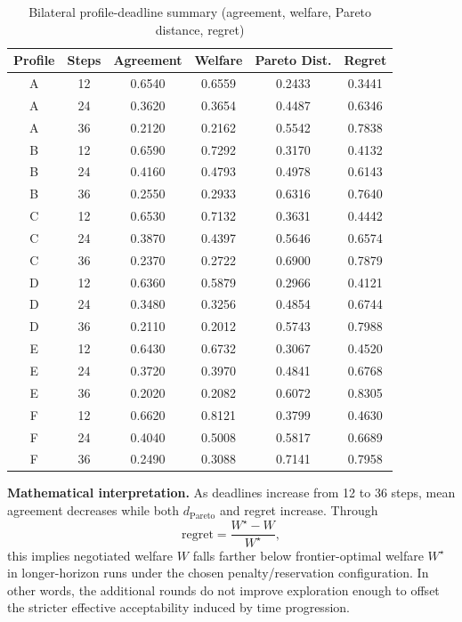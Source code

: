 \documentclass[11pt]{article}
\begin{document}
\begin{table}[H]
\centering
\caption{Bilateral profile-deadline summary (agreement, welfare, Pareto distance, regret)}
\small
\begin{tabular}{cccccc}
\toprule
Profile & Steps & Agreement & Welfare & Pareto Dist. & Regret \\
\midrule
A & 12 & 0.6540 & 0.6559 & 0.2433 & 0.3441 \\
A & 24 & 0.3620 & 0.3654 & 0.4487 & 0.6346 \\
A & 36 & 0.2120 & 0.2162 & 0.5542 & 0.7838 \\
B & 12 & 0.6590 & 0.7292 & 0.3170 & 0.4132 \\
B & 24 & 0.4160 & 0.4793 & 0.4978 & 0.6143 \\
B & 36 & 0.2550 & 0.2933 & 0.6316 & 0.7640 \\
C & 12 & 0.6530 & 0.7132 & 0.3631 & 0.4442 \\
C & 24 & 0.3870 & 0.4397 & 0.5646 & 0.6574 \\
C & 36 & 0.2370 & 0.2722 & 0.6900 & 0.7879 \\
D & 12 & 0.6360 & 0.5879 & 0.2966 & 0.4121 \\
D & 24 & 0.3480 & 0.3256 & 0.4854 & 0.6744 \\
D & 36 & 0.2110 & 0.2012 & 0.5743 & 0.7988 \\
E & 12 & 0.6430 & 0.6732 & 0.3067 & 0.4520 \\
E & 24 & 0.3720 & 0.3970 & 0.4841 & 0.6768 \\
E & 36 & 0.2020 & 0.2082 & 0.6072 & 0.8305 \\
F & 12 & 0.6620 & 0.8121 & 0.3799 & 0.4630 \\
F & 24 & 0.4040 & 0.5008 & 0.5817 & 0.6689 \\
F & 36 & 0.2490 & 0.3088 & 0.7141 & 0.7958 \\
\bottomrule
\end{tabular}
\end{table}

\noindent\textbf{Mathematical interpretation.} As deadlines increase from 12 to 36 steps, mean agreement decreases while both \(d_{\text{Pareto}}\) and regret increase. Through
\[
\text{regret}=\frac{W^\star-W}{W^\star},
\]
this implies negotiated welfare \(W\) falls farther below frontier-optimal welfare \(W^\star\) in longer-horizon runs under the chosen penalty/reservation configuration. In other words, the additional rounds do not improve exploration enough to offset the stricter effective acceptability induced by time progression.
\end{document}
